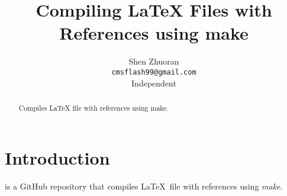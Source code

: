 \documentclass{article}
\title{Compiling LaTeX Files with References using make}
\author{
  Shen Zhuoran \\
  \texttt{cmsflash99@gmail.com} \\
  Independent \\
}
\begin{document}
\maketitle

\begin{abstract}
Compiles LaTeX file with references using make.
\end{abstract}

\section{Introduction}

\cite{self} is a GitHub repository that compiles \LaTeX \ file with references using \textit{make}.

 


\small
\end{document}
